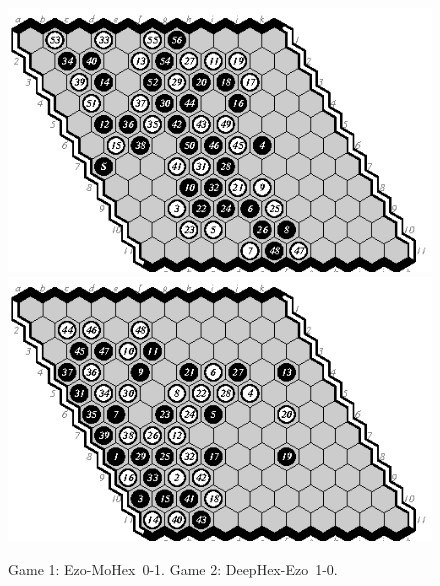 \documentclass{icga}
\def\Dx{\mbox{\sc DeepHex}}
\def\Eo{\mbox{\sc Ezo}}
\def\Mx{\mbox{\sc MoHex}}
\begin{document}
\begin{figure}[hbp]
\includegraphics[scale=1.3]{1e-m.eps}\hspace*{-1cm}\includegraphics[scale=1.3]{2d-e.eps}
\caption{Game 1: \Eo-\Mx\ 0-1. Game 2: \Dx-\Eo\ 1-0.}
\end{figure}
\end{document}
